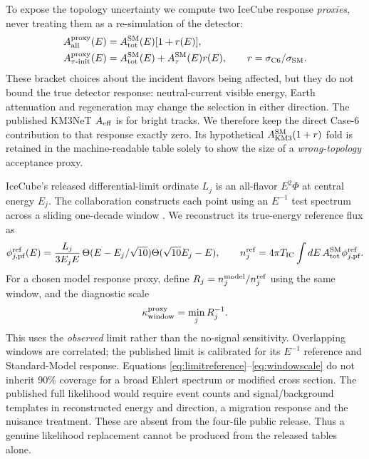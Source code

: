 \documentclass[11pt,a4paper]{article}
\begin{document}
To expose the topology uncertainty we compute two IceCube response
\emph{proxies}, never treating them as a re-simulation of the detector:
\begin{align}
 A_{\rm all}^{\rm proxy}(E)&=A_{\rm tot}^{\rm SM}(E)[1+r(E)],
 \\
 A_{\tau\text{-init}}^{\rm proxy}(E)&=
 A_{\rm tot}^{\rm SM}(E)+A_\tau^{\rm SM}(E)r(E),
 \qquad r=\sigma_{\rm C6}/\sigma_{\rm SM}.
 \label{eq:responseproxy}
\end{align}
These bracket choices about the incident flavors being affected, but they
do not bound the true detector response: neutral-current visible energy,
Earth attenuation and regeneration may change the selection in either
direction.  The published KM3NeT $A_{\rm eff}$ is for bright tracks.
We therefore keep the direct Case-6 contribution to that response exactly
zero.  Its hypothetical $A_{\rm KM3}^{\rm SM}(1+r)$ fold is retained in
the machine-readable table solely to show the size of a \emph{wrong-topology}
acceptance proxy.

IceCube's released differential-limit ordinate $L_j$ is an all-flavor
$E^2\Phi$ at central energy $E_j$.  The collaboration constructs each
point using an $E^{-1}$ test spectrum across a sliding one-decade window
\cite{IceCube:2025EHE}.  We reconstruct its true-energy reference flux as
\begin{equation}
 \phi_{j,{\rm pf}}^{\rm ref}(E)=
 \frac{L_j}{3E_j E}\,
 \Theta(E-E_j/\sqrt{10})\Theta(\sqrt{10}E_j-E),
 \qquad
 n_j^{\rm ref}=4\pi T_{\rm IC}\int dE\,
 A_{\rm tot}^{\rm SM}\phi_{j,{\rm pf}}^{\rm ref}.
 \label{eq:limitreference}
\end{equation}
For a chosen model response proxy, define $R_j=n_j^{\rm model}/n_j^{\rm ref}$
using the same window, and the diagnostic scale
\begin{equation}
 \kappa_{\rm window}^{\rm proxy}
 =\min_j R_j^{-1}.
 \label{eq:windowscale}
\end{equation}
This uses the \emph{observed} limit rather than the no-signal sensitivity.
Overlapping windows are correlated; the published limit is calibrated for
its $E^{-1}$ reference and Standard-Model response.  Equations
\eqref{eq:limitreference}--\eqref{eq:windowscale} do not inherit 90\%
coverage for a broad Ehlert spectrum or modified cross section.  The
published full likelihood would require event counts and signal/background
templates in reconstructed energy and direction, a migration response and
the nuisance treatment.  These are absent from the four-file public release.
Thus a genuine likelihood replacement cannot be produced from the released
tables alone.
\end{document}
